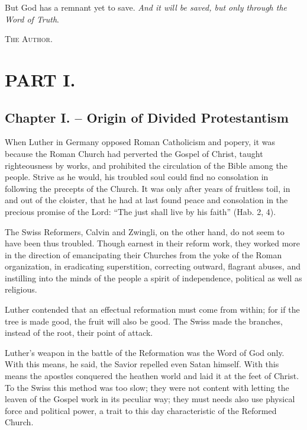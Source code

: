 \documentclass[
]{book}
\begin{document}
But God has a remnant yet to save. \emph{And it will be saved, but only through the Word of Truth}.

\textsc{The Author.}

\chapter*{PART I.}\label{part-i.}

\section*{Chapter I. -- Origin of Divided Protestantism}\label{chapter-i.-origin-of-divided-protestantism}

When Luther in Germany opposed Roman Catholicism and popery, it was because the Roman Church had perverted the Gospel of Christ, taught righteousness by works, and prohibited the circulation of the Bible among the people. Strive as he would, his troubled soul could find no consolation in following the precepts of the Church. It was only after years of fruitless toil, in and out of the cloister, that he had at last found peace and consolation in the precious promise of the Lord: ``The just shall live by his faith'' (Hab. 2, 4).

The Swiss Reformers, Calvin and Zwingli, on the other hand, do not seem to have been thus troubled. Though earnest in their reform work, they worked more in the direction of emancipating their Churches from the yoke of the Roman organization, in eradicating superstition, correcting outward, flagrant abuses, and instilling into the minds of the people a spirit of independence, political as well as religious.

Luther contended that an effectual reformation must come from within; for if the tree is made good, the fruit will also be good. The Swiss made the branches, instead of the root, their point of attack.

Luther's weapon in the battle of the Reformation was the Word of God only. With this means, he said, the Savior repelled even Satan himself. With this means the apostles conquered the heathen world and laid it at the feet of Christ. To the Swiss this method was too slow; they were not content with letting the leaven of the Gospel work in its peculiar way; they must needs also use physical force and political power, a trait to this day characteristic of the Reformed Church.
\end{document}
